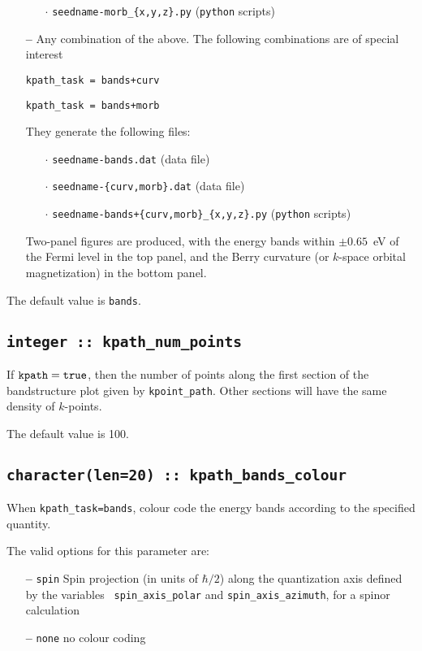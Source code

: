 \begin{itemize}
\begin{itemize}
   \item[$\cdot$] {\tt seedname-morb\_\{x,y,z\}.py} ({\tt python}
     scripts)

\end{itemize}

\item[{\bf --}] Any combination of the above.  The following
  combinations are of special interest

{\tt kpath\_task = bands+curv}

{\tt kpath\_task = bands+morb}

They generate the following files:
\begin{itemize}
  
   \item[$\cdot$] {\tt seedname-bands.dat} (data file) 

   \item[$\cdot$] {\tt seedname-\{curv,morb\}.dat} (data file) 

   \item[$\cdot$] {\tt seedname-bands+\{curv,morb\}\_\{x,y,z\}.py}
     ({\tt python} scripts)

\end{itemize}

Two-panel figures are produced, with the energy bands within $\pm
0.65$~eV of the Fermi level in the top panel, and the Berry curvature
(or $k$-space orbital magnetization) in the bottom panel.
\end{itemize}

The default value is {\tt bands}.


\subsection[kpath\_num\_points]{\tt integer :: kpath\_num\_points}

If $\verb#kpath#=\verb#true#$, then the number of points along
the first section of the bandstructure plot given by
\verb#kpoint_path#. Other sections will have the same density of
$k$-points. 

The default value is 100.


\subsection[kpath\_colour]{\tt character(len=20) ::
  kpath\_bands\_colour}
When {\tt kpath\_task=bands}, colour code the energy bands according
to the specified quantity.

The valid options for this parameter are:
\begin{itemize}
\item[{\bf --}] \verb#spin# Spin projection (in units of $\hbar/2$)
  along the quantization axis defined by the variables {\tt
    spin\_axis\_polar} and {\tt spin\_axis\_azimuth}, for a spinor
  calculation
\item[{\bf --}]  \verb#none# no colour coding
\end{itemize}

